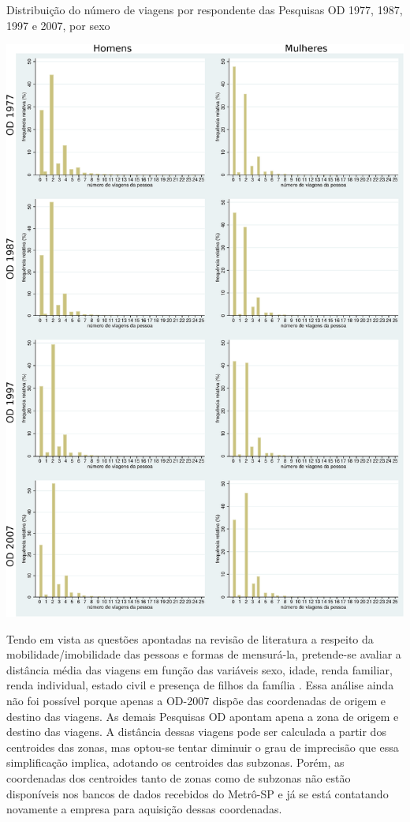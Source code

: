 \begin{grafico}[htb]%
    \caption{\label{graf:distr-num-viag}Distribuição do número de viagens por respondente das Pesquisas OD 1977, 1987, 1997 e 2007, por sexo}%
    \begin{center}%
        \includegraphics[width=1\textwidth]{./imagens/qtdeviagens2.eps}%
    \end{center}%
\end{grafico}%

Tendo em vista as questões apontadas na revisão de literatura a respeito da mobilidade/imobilidade das pessoas e formas de mensurá-la, pretende-se avaliar a distância média das viagens em função das variáveis sexo, idade, renda familiar, renda individual, estado civil e presença de filhos da família \cite{ROSENBLOOM2006,SHEARMUR2006,HANSON2010}. Essa análise ainda não foi possível porque apenas a OD-2007 dispõe das coordenadas de origem e destino das viagens. As demais Pesquisas OD apontam apena a zona de origem e destino das viagens. A distância dessas viagens pode ser calculada a partir dos centroides das zonas, mas optou-se tentar diminuir o grau de imprecisão que essa simplificação implica, adotando os centroides das subzonas. Porém, as coordenadas dos centroides tanto de zonas como de subzonas não estão disponíveis nos bancos de dados recebidos do Metrô-SP e já se está contatando novamente a empresa para aquisição dessas coordenadas.

